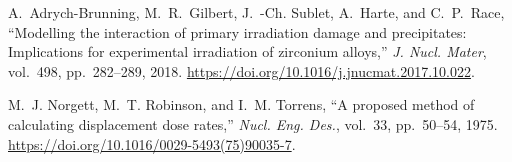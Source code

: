 \documentclass[a4paper]{article}
\begin{document}
\begin{thebibliography}{10}
A.~Adrych-Brunning, M.~R.~Gilbert, J.~{\relax -Ch}. Sublet, A.~Harte, and C.~P.~Race, ``Modelling the interaction of primary irradiation damage and
precipitates: Implications for experimental irradiation of zirconium
alloys,'' {\em J. Nucl. Mater},
  vol.~498, pp.~282--289, 2018.
\newblock \url{https://doi.org/10.1016/j.jnucmat.2017.10.022}.

M.~J. Norgett, M.~T. Robinson, and I.~M. Torrens, ``{{A proposed method of calculating
  displacement dose rates}},'' {\em Nucl. Eng. Des.}, vol.~33, pp.~50--54, 1975.
\newblock \url{https://doi.org/10.1016/0029-5493(75)90035-7}.







\end{thebibliography}
\end{document}
